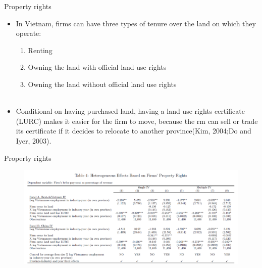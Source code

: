 \documentclass{beamer}
\begin{document}
\begin{frame}{Property rights}

\begin{itemize}
\item In Vietnam, firms can have three types of tenure over the land on which they operate:
\begin{enumerate}
\item Renting
\item Owning the land with official land use rights
\item Owning the land without official land use rights \\~
\end{enumerate}

\item Conditional on having purchased land, having a land use rights certificate (LURC) makes it easier for the firm to move, because the rm can sell or trade its certificate if it decides to relocate to another province(Kim, 2004;Do and Iyer, 2003).
\end{itemize}

\end{frame}

\begin{frame}{Property rights}

\begin{figure}
\centering
\includegraphics[width=1\linewidth]{12.png}
\end{figure}

\end{frame}
\end{document}
